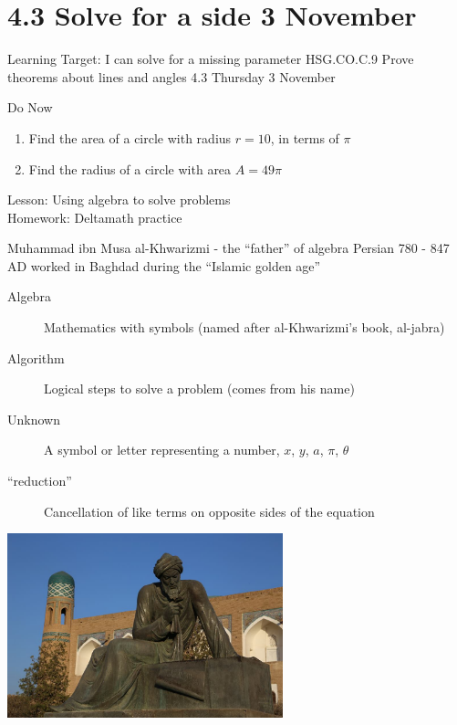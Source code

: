 \section{4.3 Solve for a side \hfill 3 November \,}
  \begin{frame}{Learning Target: I can solve for a missing parameter}
    {HSG.CO.C.9 Prove theorems about lines and angles  \hfill \alert{4.3 Thursday 3 November}}
    \begin{block}{Do Now}
      \begin{enumerate}
        \item Find the area of a circle with radius $r=10$, in terms of $\pi$
        \item Find the radius of a circle with area $A=49 \pi$
      \end{enumerate}
    \end{block}
      Lesson: Using algebra to solve problems \\
      Homework: Deltamath practice
  \end{frame}

\begin{frame}{Muhammad ibn Musa al-Khwarizmi - the ``father'' of algebra}
  {Persian 780 - 847 AD worked in Baghdad during the ``Islamic golden age''}
  \begin{description}
    \item[Algebra] Mathematics with symbols (named after al-Khwarizmi's book, al-jabra)
    \item[Algorithm] Logical steps to solve a problem (comes from his name)
    \item[Unknown] A symbol or letter representing a number, $x$, $y$, $a$, $\pi$, $\theta$
    \item[``reduction''] Cancellation of like terms on opposite sides of the equation
  \end{description}
    \center
    \includegraphics[width=0.6\textwidth]{../graphics/al-Khwarizmi_960-640.jpg}
\end{frame}

